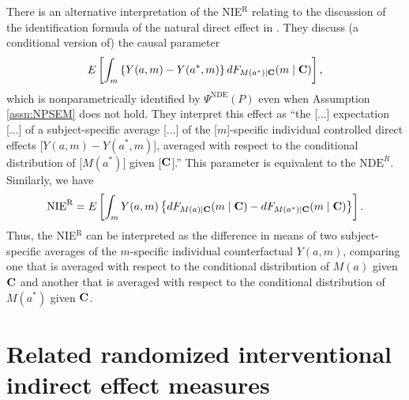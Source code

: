 \documentclass[12pt]{article}
\begin{document}
There is an alternative interpretation of the NIE$^{\text{R}}$ relating to the discussion of the identification formula of the natural direct effect in \cite{van2008direct}. They discuss (a conditional version of) the causal parameter 
\[E\left[\int_m\left\{Y(a,m)-Y(a^*,m)\right\}dF_{M(a^*)\mid {\bf C}}(m\mid {\bf C})\right],\]
which is nonparametrically identified by $\Psi^{\text{NDE}}(P)$ even when Assumption \ref{assn:NPSEM} does not hold. They interpret this effect as ``the [...] expectation [...] of a subject-specific average [...] of the [$m$]-specific individual controlled direct effects [$Y(a,m)-Y(a^*,m)$], averaged with respect to the conditional distribution of [$M(a^*)$] given [$\bf C$].'' This parameter is equivalent to the $\text{NDE}^{R}$. Similarly, we have 
\[\text{NIE}^{\text{R}}=E\left[\int_mY(a,m)\left\{dF_{M(a)\mid {\bf C}}(m\mid {\bf C})-dF_{M(a^*)\mid {\bf C}}(m\mid {\bf C})\right\}\right].\]
Thus, the NIE$^{\text{R}}$ can be interpreted as the difference in means of two subject-specific averages of the $m$-specific individual counterfactual $Y(a,m)$, comparing one that is averaged with respect to the conditional distribution of $M(a)$ given $\bf C$ and another that is averaged with respect to the conditional distribution of $M(a^*)$ given $\bf C$.

\section{Related randomized interventional indirect effect measures}
\label{sec:related}
\begin{comment}
[MIGHT LEAVE THIS PART OFF -- KIND OF A STRETCH AND OBVIOUSLY LESS RELATED TO INDIRECT EFFECT THAN THE SPECIAL CASE]
\cite{geneletti2007identifying} also proposed generalized versions of their respective randomized interventional effects that, if one allows for the existence of counterfactuals, are equal to  
\label{sec:related}
\[E\left[\int_m\left\{Y(a,m)-Y(a^*,m)\right\}dQ_{M\mid {\bf C}}(m\mid {\bf C})\right],\]
under Assumption \ref{assn:consistency}. 
\end{comment}
\end{document}
